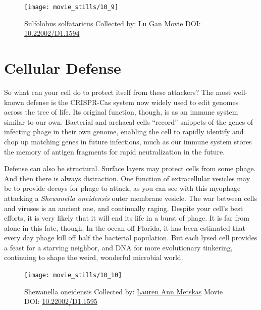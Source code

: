 \documentclass[]{tufte-book}
\begin{document}
\begin{figure}
\texttt{[image: movie\_stills/10\_9]} \caption[Sulfolobus solfataricus Collected by:
\protect\hyperlink{lu_gan}{Lu Gan} Movie DOI:
\href{https://doi.org/10.22002/D1.1594}{10.22002/D1.1594}]{Sulfolobus solfataricus Collected by:
\protect\hyperlink{lu_gan}{Lu Gan} Movie DOI:
\href{https://doi.org/10.22002/D1.1594}{10.22002/D1.1594}}\label{fig:10-9}
\end{figure}

\section{Cellular Defense}\label{cellular-defense}

So what can your cell do to protect itself from these attackers? The
most well-known defense is the CRISPR-Cas system now widely used to edit
genomes across the tree of life. Its original function, though, is as an
immune system similar to our own. Bacterial and archaeal cells
``record'' snippets of the genes of infecting phage in their own genome,
enabling the cell to rapidly identify and chop up matching genes in
future infections, much as our immune system stores the memory of
antigen fragments for rapid neutralization in the future.

Defense can also be structural. Surface layers may protect cells from
some phage. And then there is always distraction. One function of
extracellular vesicles may be to provide decoys for phage to attack, as
you can see with this myophage attacking a \emph{Shewanella oneidensis}
outer membrane vesicle. The war between cells and viruses is an ancient
one, and continually raging. Despite your cell's best efforts, it is
very likely that it will end its life in a burst of phage. It is far
from alone in this fate, though. In the ocean off Florida, it has been
estimated that every day phage kill off half the bacterial population.
But each lysed cell provides a feast for a starving neighbor, and DNA
for more evolutionary tinkering, continuing to shape the weird,
wonderful microbial world.





\begin{figure}
\texttt{[image: movie\_stills/10\_10]} \caption[Shewanella oneidensis Collected by:
\protect\hyperlink{lauren_ann_metskas}{Lauren Ann Metskas} Movie DOI:
\href{https://doi.org/10.22002/D1.1595}{10.22002/D1.1595}]{Shewanella oneidensis Collected by:
\protect\hyperlink{lauren_ann_metskas}{Lauren Ann Metskas} Movie DOI:
\href{https://doi.org/10.22002/D1.1595}{10.22002/D1.1595}}\label{fig:10-10}
\end{figure}
\end{document}
